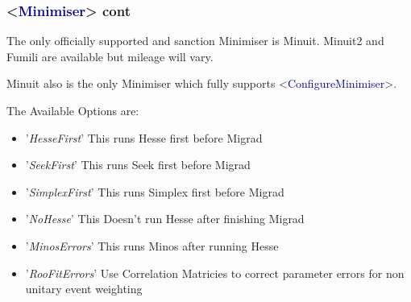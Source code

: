 \documentclass{beamer}
\begin{document}
\begin{frame}
\frametitle{<\textcolor{darkblue}{Minimiser}> cont}
The only officially supported and sanction Minimiser is Minuit.\newline
Minuit2 and Fumili are available but mileage will vary.\newline

Minuit also is the only Minimiser which fully supports <\textcolor{darkblue}{ConfigureMinimiser}>.\newline

The Available Options are:\newline
\begin{itemize}
\item '\textit{HesseFirst}' This runs Hesse first before Migrad
\item '\textit{SeekFirst}' This runs Seek first before Migrad
\item '\textit{SimplexFirst}' This runs Simplex first before Migrad
\item '\textit{NoHesse}' This Doesn't run Hesse after finishing Migrad
\item '\textit{MinosErrors}' This runs Minos after running Hesse
\item '\textit{RooFitErrors}' Use Correlation Matricies to correct parameter errors for non unitary event weighting
\end{itemize}
\end{frame}
\end{document}
